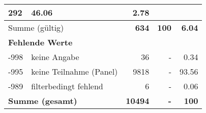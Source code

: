 \begin{longtable}{lXrrr}
       \num{292} &
       \num[round-mode=places,round-precision=2]{46,06} &
         \num[round-mode=places,round-precision=2]{2,78} \\
     \midrule
     \multicolumn{2}{l}{Summe (gültig)} &
       \textbf{\num{634}} &
     \textbf{100} &
       \textbf{\num[round-mode=places,round-precision=2]{6,04}} \\
     \multicolumn{5}{l}{\textbf{Fehlende Werte}}\\
       -998 &
       keine Angabe &
         \num{36} &
        - &
         \num[round-mode=places,round-precision=2]{0,34} \\
       -995 &
       keine Teilnahme (Panel) &
         \num{9818} &
        - &
         \num[round-mode=places,round-precision=2]{93,56} \\
       -989 &
       filterbedingt fehlend &
         \num{6} &
        - &
         \num[round-mode=places,round-precision=2]{0,06} \\
     \midrule
     \multicolumn{2}{l}{\textbf{Summe (gesamt)}} &
          \textbf{\num{10494}} &
        \textbf{-} &
        \textbf{100} \\
     \bottomrule
     \end{longtable}
     
